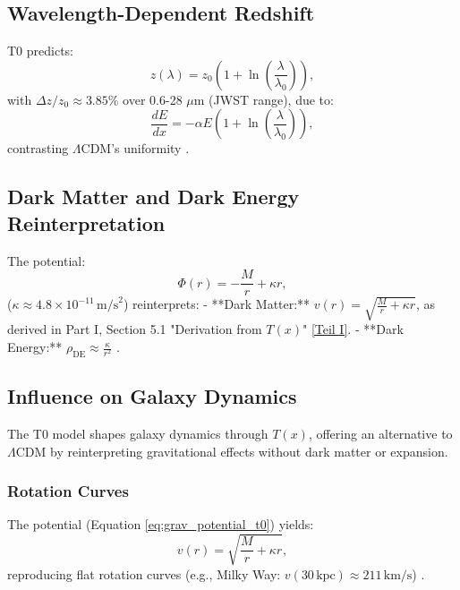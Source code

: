 \documentclass[12pt,a4paper]{article}
\newcommand{\Tfield}{T(x)}
\begin{document}
	\subsection{Wavelength-Dependent Redshift}
	\label{subsec:wavelength_redshift}
	
	T0 predicts:
	\begin{equation}
		z(\lambda) = z_0 \left(1 + \ln\left(\frac{\lambda}{\lambda_0}\right)\right),
		\label{eq:wavelength_redshift}
	\end{equation}
	with \(\Delta z / z_0 \approx 3.85\%\) over 0.6-28 \(\mu\text{m}\) (JWST range), due to:
	\begin{equation}
		\frac{dE}{dx} = -\alpha E \left(1 + \ln\left(\frac{\lambda}{\lambda_0}\right)\right),
		\label{eq:wavelength_energy_loss}
	\end{equation}
	contrasting \(\Lambda\)CDM’s uniformity \cite{pascher_params_2025}.
	
	\subsection{Dark Matter and Dark Energy Reinterpretation}
	\label{subsec:dark_reinterpretation}
	
	The potential:
	\begin{equation}
		\Phi(r) = -\frac{M}{r} + \kappa r,
		\label{eq:grav_potential_t0}
	\end{equation}
	(\(\kappa \approx 4.8 \times 10^{-11} \, \text{m/s}^2\)) reinterprets:
	- **Dark Matter:** \(v(r) = \sqrt{\frac{M}{r} + \kappa r}\), as derived in Part I, Section 5.1 "Derivation from \(\Tfield\)" \href{https://github.com/jpascher/T0-Time-Mass-Duality/tree/main/2/pdf/English/QMRelTimeMassPart1En.pdf}{[Teil I]}.
	- **Dark Energy:** \(\rho_{\text{DE}} \approx \frac{\kappa}{r^2}\) \cite{pascher_galaxies_2025}.
	
	\subsection{Influence on Galaxy Dynamics}
	\label{subsec:galaxy_dynamics}
	
	The T0 model shapes galaxy dynamics through \(\Tfield\), offering an alternative to \(\Lambda\)CDM by reinterpreting gravitational effects without dark matter or expansion.
	
	\subsubsection{Rotation Curves}
	The potential (Equation \ref{eq:grav_potential_t0}) yields:
	\begin{equation}
		v(r) = \sqrt{\frac{M}{r} + \kappa r},
		\label{eq:rotation_velocity}
	\end{equation}
	reproducing flat rotation curves (e.g., Milky Way: \(v(30 \, \text{kpc}) \approx 211 \, \text{km/s}\)) \cite{pascher_galaxies_2025}.
	
\end{document}
